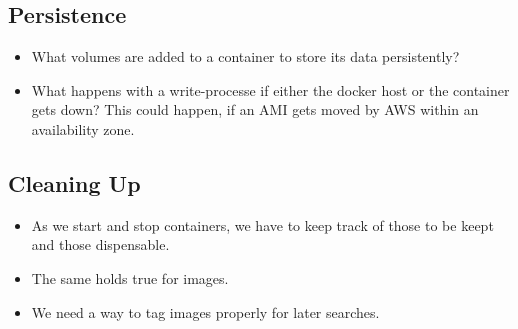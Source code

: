 \documentclass[captions=tableheading]{article}
\begin{document}
\subsection{Persistence}
\label{sec-10-3}

\begin{itemize}
\item What volumes are added to a container to store its data persistently?
\item What happens with a write-processe if either the docker host or the container gets down? This could happen, if an AMI gets moved by AWS within an availability zone.
\end{itemize}
\subsection{Cleaning Up}
\label{sec-10-4}

\begin{itemize}
\item As we start and stop containers, we have to keep track of those to be keept and those dispensable.
\item The same holds true for images.
\item We need a way to tag images properly for later searches.
\end{itemize}
\end{document}

